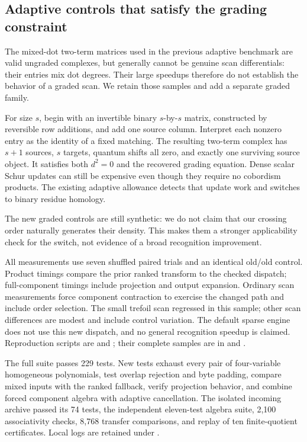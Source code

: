 \subsection{Adaptive controls that satisfy the grading constraint}
The mixed-dot two-term matrices used in the previous adaptive
benchmark are valid ungraded complexes, but generally cannot be
genuine scan differentials: their entries mix dot degrees. Their
large speedups therefore do not establish the behavior of a graded
scan. We retain those samples and add a separate graded family.

For size $s$, begin with an invertible binary $s$-by-$s$ matrix,
constructed by reversible row additions, and add one source column.
Interpret each nonzero entry as the identity of a fixed matching.
The resulting two-term complex has $s+1$ sources, $s$ targets,
quantum shifts all zero, and exactly one surviving source object.
It satisfies both $d^2=0$ and the recovered grading equation.
Dense scalar Schur updates can still be expensive even though they
require no cobordism products. The existing adaptive allowance detects
that update work and switches to binary residue homology.

The new graded controls are still synthetic: we do not claim that
our crossing order naturally generates their density. This makes
them a stronger applicability check for the switch, not evidence of
a broad recognition improvement.



All measurements use seven shuffled paired trials and an identical
old/old control. Product timings compare the prior ranked transform
to the checked dispatch; full-component timings include projection
and output expansion. Ordinary scan measurements force component
contraction to exercise the changed path and include order selection.
The small trefoil scan regressed in this sample; other scan differences
are modest and include control variation. The default sparse engine
does not use this new dispatch, and no general recognition speedup is
claimed. Reproduction scripts are 
and ; their complete samples
are in  and
.

The full suite passes 229 tests. New tests exhaust every pair of
four-variable homogeneous polynomials, test overlap rejection and
byte padding, compare mixed inputs with the ranked fallback, verify
projection behavior, and combine forced component algebra with adaptive
cancellation. The isolated incoming archive passed its 74 tests,
the independent eleven-test algebra suite, 2,100 associativity
checks, 8,768 transfer comparisons, and replay of ten finite-quotient
certificates. Local logs are retained under .

